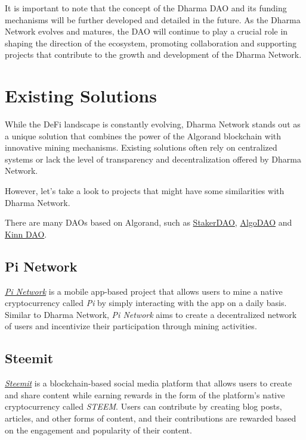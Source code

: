 It is important to note that the concept of the Dharma DAO and its funding mechanisms will be further developed and detailed in the future. As the Dharma Network evolves and matures, the DAO will continue to play a crucial role in shaping the direction of the ecosystem, promoting collaboration and supporting projects that contribute to the growth and development of the Dharma Network.\newline

\section{Existing Solutions}

While the DeFi landscape is constantly evolving, Dharma Network stands out as a unique solution that combines the power of the Algorand blockchain with innovative mining mechanisms. Existing solutions often rely on centralized systems or lack the level of transparency and decentralization offered by Dharma Network.\newline

However, let's take a look to projects that might have some similarities with Dharma Network.\newline

There are many DAOs based on Algorand, such as \href{https://algorand.com/pt/ecosystem/use-cases/staker-dao}{StakerDAO}, \href{https://algodao.fi}{AlgoDAO} and \href{https://www.algorand.foundation/news/kinn-grant-award}{Kinn DAO}. 

\subsection{Pi Network}

\href{https://minepi.com}{\textit{Pi Network}} is a mobile app-based project that allows users to mine a native cryptocurrency called \textit{Pi} by simply interacting with the app on a daily basis. Similar to Dharma Network, \textit{Pi Network} aims to create a decentralized network of users and incentivize their participation through mining activities. 

\subsection{Steemit}

\href{https://steemit.com}{\textit{Steemit}} is a blockchain-based social media platform that allows users to create and share content while earning rewards in the form of the platform's native cryptocurrency called \textit{STEEM}. Users can contribute by creating blog posts, articles, and other forms of content, and their contributions are rewarded based on the engagement and popularity of their content.\newline

